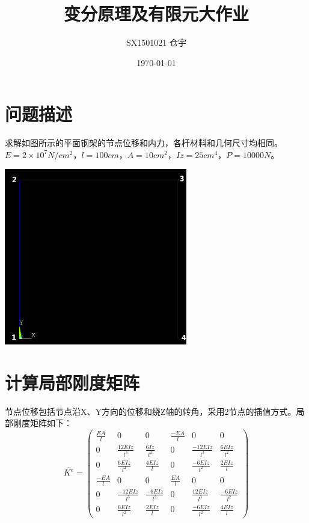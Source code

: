 \documentclass[UTF8]{ctexart}
\title{\heiti 变分原理及有限元大作业}
\author{SX1501021 仓宇}
\date{\today}
\begin{document}
\maketitle

\clearpage

\tableofcontents

\clearpage

\section{问题描述}
求解如图所示的平面钢架的节点位移和内力，各杆材料和几何尺寸均相同。$E=2\times10^7N/cm^2$，$l=100cm$，$A=10cm^2$，$Iz=25cm^4$，$P=10000N$。
\begin{center}
\includegraphics[width=8cm]{ScreenClip-1.png}
\end{center}

\section{计算局部刚度矩阵}
节点位移包括节点沿X、Y方向的位移和绕Z轴的转角，采用2节点的插值方式。局部刚度矩阵如下：
\[ \overline{K^e}= \begin{pmatrix}
	\frac{EA}{l} & 0 & 0 & \frac{-EA}{l} & 0 & 0 \\
    	0 & \frac{12EIz}{l^3} & \frac{6Iz}{l^2} & 0 & \frac{-12EIz}{l^3} & \frac{6EIz}{l^2} \\
    	0 & \frac{6EIz}{l^2} & \frac{4EIz}{l} & 0 & \frac{-6EIz}{l^2} & \frac{2EIz}{l} \\
    	\frac{-EA}{l} & 0 & 0 & \frac{EA}{l} & 0 & 0\\
    	0 & \frac{-12EIz}{l^3} & \frac{-6EIz}{l^2} & 0 & \frac{12EIz}{l^3} & \frac{-6EIz}{l^2} \\
    	0 & \frac{6EIz}{l^2} & \frac{2EIz}{l} & 0 & \frac{-6EIz}{l^2} & \frac{4EIz}{l}
\end{pmatrix} \]
\end{document}

